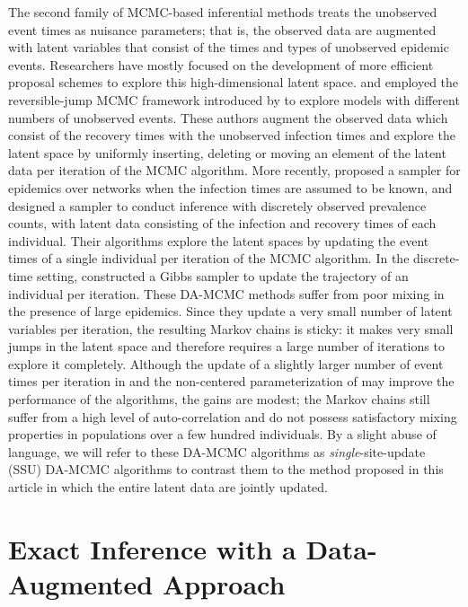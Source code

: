 \documentclass[12pt]{article}
\begin{document}
	The second family of MCMC-based inferential methods treats the unobserved event times as nuisance parameters; that is, the observed data are augmented with latent variables that consist of the times and types of unobserved epidemic events.
	Researchers have mostly focused on the development of more efficient proposal schemes to explore this high-dimensional latent space. \cite{Gibson.1998} and \cite{ONeill.1999} employed the reversible-jump MCMC framework introduced by \cite{Green.1995} to explore models with different numbers of unobserved events. These authors augment the observed data which consist of the recovery times with the unobserved infection times and explore the latent space by uniformly inserting, deleting or moving an element of the latent data per iteration of the MCMC algorithm. 
	More recently, \cite{Bu.2020} proposed a sampler for epidemics over networks when the infection times are assumed to be known, and \cite{Fintzi.2017} designed a sampler to conduct inference with discretely observed prevalence counts, with latent data consisting of the infection and recovery times of each individual. Their algorithms explore the latent spaces by updating the event times of a single individual per iteration of the MCMC algorithm. %
	In the discrete-time setting, \cite{Touloupou.2020} constructed a Gibbs sampler to update the trajectory of an individual per iteration.
	These DA-MCMC methods suffer from poor mixing in the presence of large epidemics. Since they update a very small number of latent variables per iteration, the resulting Markov chains is sticky: it makes very small jumps in the latent space and therefore requires a large number of iterations to explore it completely.
	Although the update of a slightly larger number of event times per iteration in \cite{Pooley.2015} and the non-centered parameterization of \cite{Neal.2005} may improve the performance of the algorithms, the gains are modest; the Markov chains still suffer from a high level of auto-correlation and do not possess satisfactory mixing properties in populations over a few hundred individuals.
	By a slight abuse of language, we will refer to these DA-MCMC algorithms as \textit{single}-site-update (SSU) DA-MCMC algorithms to contrast them to the method proposed in this article in which the entire latent data are jointly updated.
	
	\section{Exact Inference with a  Data-Augmented Approach}
	\label{sec:con}
	
\end{document}
